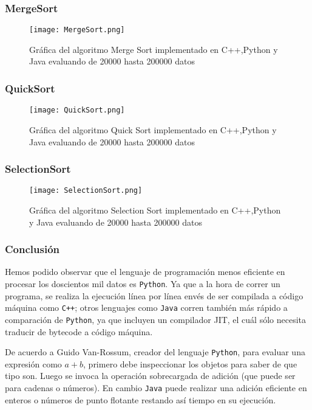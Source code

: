 \subsubsection*{MergeSort}
\begin{figure}[H]
	   \centering
	   \texttt{[image: MergeSort.png]}
	   \caption{Gráfica del algoritmo Merge Sort implementado en C++,Python y Java evaluando de 20000 hasta 200000 datos}
\end{figure}
\subsubsection*{QuickSort}
\begin{figure}[H]
	   \centering
	   \texttt{[image: QuickSort.png]}
	   \caption{Gráfica del algoritmo Quick Sort implementado en C++,Python y Java evaluando de 20000 hasta 200000 datos}
\end{figure}
\subsubsection*{SelectionSort}
\begin{figure}[H]
	   \centering
	   \texttt{[image: SelectionSort.png]}
	   \caption{Gráfica del algoritmo Selection Sort implementado en C++,Python y Java evaluando de 20000 hasta 200000 datos}
\end{figure}

\subsubsection*{Conclusión}
Hemos podido observar que el lenguaje de programación menos eficiente en procesar los doscientos mil datos es \verb!Python!. Ya que a la hora de correr un programa, se realiza la ejecución línea por línea envés de ser compilada a código máquina como \verb!C++!; otros lenguajes como \verb!Java! corren también más rápido a comparación de \verb!Python!, ya que incluyen un compilador JIT, el cuál sólo necesita traducir de bytecode a código máquina.

De acuerdo a Guido Van-Rossum, creador del lenguaje \verb!Python!, para evaluar una expresión como $a+b$, primero debe inspeccionar los objetos para saber de que tipo son. Luego se invoca la operación sobrecargada de adición (que puede ser para cadenas o números). En cambio \verb!Java! puede realizar una adición eficiente en enteros o números de punto flotante restando así tiempo en su ejecución.\cite{guido}

